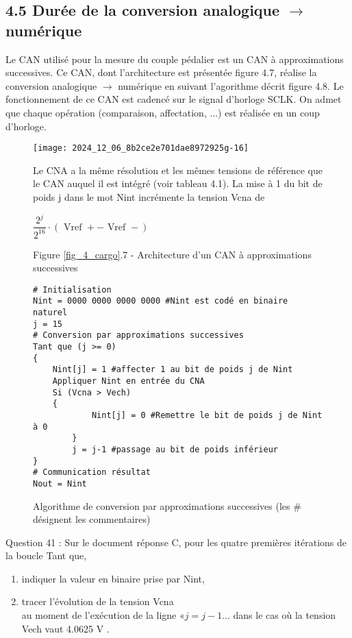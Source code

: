 \subsection{4.5 Durée de la conversion analogique \(\rightarrow\) numérique}
Le CAN utilisé pour la mesure du couple pédalier est un CAN à approximations successives. Ce CAN, dont l'architecture est présentée figure 4.7, réalise la conversion analogique \(\rightarrow\) numérique en suivant l'agorithme décrit figure 4.8. Le fonctionnement de ce CAN est cadencé sur le signal d'horloge SCLK. On admet que chaque opération (comparaison, affectation, ...) est réalisée en un coup d'horloge.\\

\begin{figure}[!htb]
\begin{center}
\texttt{[image: 2024\_12\_06\_8b2ce2e701dae8972925g-16]}

Le CNA a la même résolution et les mêmes tensions de référence que le CAN auquel il est intégré (voir tableau 4.1). La mise à 1 du bit de poids j dans le mot Nint incrémente la tension Vcna de

$
\dfrac{2^{j}}{2^{16}} \cdot(\text { Vref }+- \text { Vref }-)
$

Figure \ref{fig_4_cargo}.7 - Architecture d'un CAN à approximations successives

\begin{verbatim}
# Initialisation
Nint = 0000 0000 0000 0000 #Nint est codé en binaire naturel
j = 15
# Conversion par approximations successives
Tant que (j >= 0)
{
    Nint[j] = 1 #affecter 1 au bit de poids j de Nint
    Appliquer Nint en entrée du CNA
    Si (Vcna > Vech)
    {
            Nint[j] = 0 #Remettre le bit de poids j de Nint à 0
        }
        j = j-1 #passage au bit de poids inférieur
}
# Communication résultat
Nout = Nint
\end{verbatim}
\caption{Algorithme de conversion par approximations successives (les \# désignent les commentaires) \label{fig12}}
\end{center}
\end{figure}

Question 41 : Sur le document réponse C, pour les quatre premières itérations de la boucle Tant que,

\begin{enumerate}
  \item indiquer la valeur en binaire prise par Nint,
  \item tracer l'évolution de la tension Vcna\\
au moment de l'exécution de la ligne \(« j=j-1 \ldots\) dans le cas où la tension Vech vaut 4.0625 V .
\end{enumerate}

